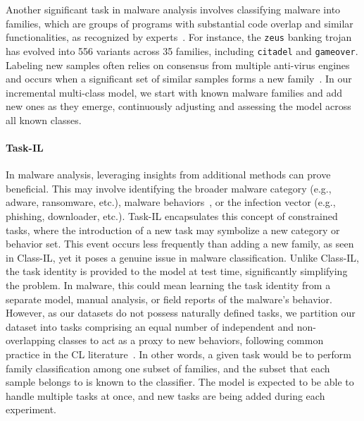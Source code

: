 
Another significant task in malware analysis involves classifying malware into families, which are groups of programs with substantial code overlap and similar functionalities, as recognized by experts~\cite{zhu2020measuring}. For instance, the \texttt{zeus} banking trojan has evolved into 556 variants across 35 families, including \texttt{citadel} and \texttt{gameover}. Labeling new samples often relies on consensus from multiple anti-virus engines and occurs when a significant set of similar samples forms a new family~\cite{kantchelian2015better,zhu2020measuring}. In our incremental multi-class model, we start with known malware families and add new ones as they emerge, continuously adjusting and assessing the model across all known classes.





\paragraph{Task-IL}
In malware analysis, leveraging insights from additional methods can prove beneficial. This may involve identifying the broader malware category (e.g., adware, ransomware, etc.), malware behaviors~\cite{maliciousbehavior}, or the infection vector (e.g., phishing, downloader, etc.). Task-IL encapsulates this concept of constrained tasks, where the introduction of a new task may symbolize a new category or behavior set. This event occurs less frequently than adding a new family, as seen in Class-IL, yet it poses a genuine issue in malware classification. Unlike Class-IL, the task identity is provided to the model at test time, significantly simplifying the problem. In malware, this could mean learning the task identity from a separate model, manual analysis, or field reports of the malware's behavior. However, as our datasets do not possess naturally defined tasks, we partition our dataset into tasks comprising an equal number of independent and non-overlapping classes to act as a proxy to new behaviors, following common practice in the CL literature~\cite{van2022three,BIR}. In other words, a given task would be to perform family classification among one subset of families, and the subset that each sample belongs to is known to the classifier. The model is expected to be able to handle multiple tasks at once, and new tasks are being added during each experiment.


